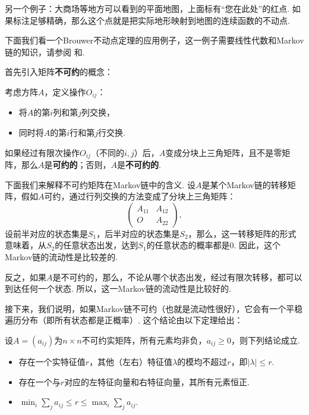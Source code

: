 另一个例子：大商场等地方可以看到的平面地图，上面标有“您在此处”的红点. 如果标注足够精确，那么这个点就是把实际地形映射到地图的连续函数的不动点.

下面我们看一个Brouwer不动点定理的应用例子，这一例子需要线性代数和Markov链的知识，请参阅 和.

首先引入矩阵\textbf{不可约}的概念：

\begin{definition}[不可约矩阵]
    考虑方阵$A$，定义操作$O_{ij}$：
    \begin{itemize}
        \item 将$A$的第$i$列和第$j$列交换，
        \item 同时将$A$的第$i$行和第$j$行交换.
    \end{itemize}

    如果经过有限次操作$O_{ij}$（不同的$i,j$）后，$A$变成分块上三角矩阵，且不是零矩阵，那么$A$是\textbf{可约的}；否则，$A$是\textbf{不可约的}.
\end{definition}

下面我们来解释不可约矩阵在Markov链中的含义. 设$A$是某个Markov链的转移矩阵，假如$A$可约，通过行列交换的方法变成了分块上三角矩阵：
\[\begin{pmatrix}
    A_{11} & A_{12}\\
    O & A_{22}
\end{pmatrix},\]
设前半对应的状态集是$S_1$，后半对应的状态集是$S_2$，那么，这一转移矩阵的形式意味着，从$S_2$的任意状态出发，达到$S_1$的任意状态的概率都是$0$. 因此，这个Markov链的流动性是比较差的. 

反之，如果$A$是不可约的，那么，不论从哪个状态出发，经过有限次转移，都可以到达任何一个状态. 所以，这一Markov链的流动性是比较好的.

接下来，我们说明，如果Markov链不可约（也就是流动性很好），它会有一个平稳遍历分布（即所有状态都是正概率）. 这个结论由以下定理给出：

\begin{theorem}\label{thm:perron-frobenius}
    设$A=(a_{ij})$为$n\times n$不可约实矩阵，所有元素均非负，$a_{ij}\geq 0$，则下列结论成立.
    \begin{itemize}
        \item 存在一个实特征值$r$，其他（左右）特征值$\lambda$的模均不超过$r$，即$|\lambda|\leq r$.
        \item 存在一个与$r$对应的左特征向量和右特征向量，其所有元素恒正.
        \item $\min_i\sum_{j}a_{ij}\leq r\leq \max_i\sum_j a_{ij}$.
    \end{itemize}
\end{theorem}

